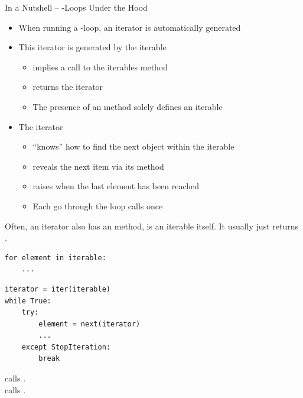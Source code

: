
\begin{frame}[fragile]{In a Nutshell -- -Loops Under the Hood}
%
\begin{itemize}
\item When running a -loop, an iterator is automatically generated
\item This iterator is generated by the iterable
	\begin{itemize}
	\item {} implies a call to the iterables  method
	\item {} returns the iterator
	\item The presence of an  method solely defines an iterable
	\end{itemize}
\item The iterator
	\begin{itemize}
	\item \enquote{knows} how to find the next object within the iterable
	\item reveals the next item via its  method
	\item raises  when the last element has been reached
	\item Each go through the loop calls  once
	\end{itemize}
\end{itemize}
%
\begin{hintbox}
\footnotesize
Often, an iterator also has an  method, \ie is an iterable itself. It usually just returns .
\end{hintbox}
%
\end{frame}


\begin{frame}[fragile]
%
\begin{codebox}
\begin{verbatim}
for element in iterable:
    ...
\end{verbatim}
\end{codebox}
%
\begin{codebox}
\begin{verbatim}
iterator = iter(iterable)
while True:
    try:
        element = next(iterator)
        ...
    except StopIteration:
        break
\end{verbatim}
\end{codebox}
%
\begin{hintbox}
\footnotesize
{} calls .\\
 calls .
\end{hintbox}
%
\end{frame}

